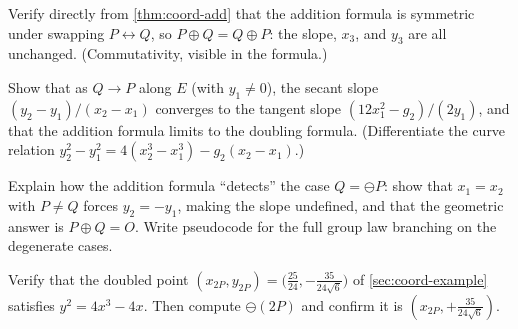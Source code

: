 \begin{exercise}
\label{ex:coord-commute}
Verify directly from \cref{thm:coord-add} that the addition formula is symmetric
under swapping \(P \leftrightarrow Q\), so \(P \oplus Q = Q \oplus P\): the slope,
\(x_3\), and \(y_3\) are all unchanged. (Commutativity, visible in the formula.)
\end{exercise}

\begin{exercise}
\label{ex:coord-limit}
Show that as \(Q \to P\) along \(E\) (with \(y_1 \ne 0\)), the secant slope
\((y_2-y_1)/(x_2-x_1)\) converges to the tangent slope \((12x_1^2 - g_2)/(2y_1)\),
and that the addition formula limits to the doubling formula. (Differentiate the
curve relation \(y_2^2 - y_1^2 = 4(x_2^3 - x_1^3) - g_2(x_2 - x_1)\).)
\end{exercise}

\begin{exercise}
\label{ex:coord-vertical}
Explain how the addition formula ``detects'' the case \(Q = \ominus P\): show that
\(x_1 = x_2\) with \(P \ne Q\) forces \(y_2 = -y_1\), making the slope undefined,
and that the geometric answer is \(P \oplus Q = O\). Write pseudocode for the full
group law branching on the degenerate cases.
\end{exercise}

\begin{exercise}
\label{ex:coord-check}
Verify that the doubled point \((x_{2P}, y_{2P}) = \bigl(\tfrac{25}{24},
-\tfrac{35}{24\sqrt6}\bigr)\) of \cref{sec:coord-example} satisfies
\(y^2 = 4x^3 - 4x\). Then compute \(\ominus(2P)\) and confirm it is
\((x_{2P}, +\tfrac{35}{24\sqrt6})\).
\end{exercise}
